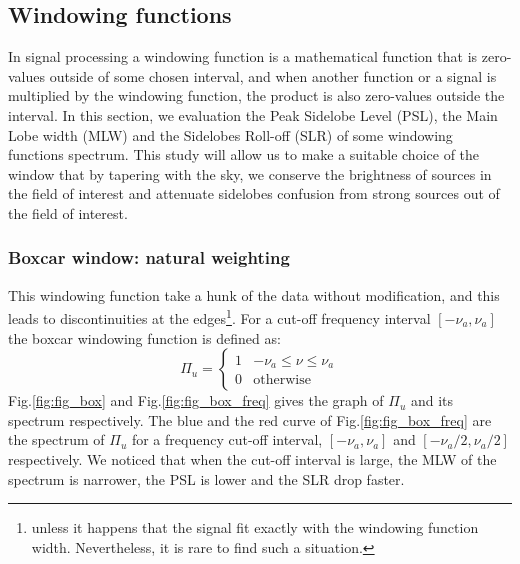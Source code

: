 \documentclass[useAMS,usenatbib]{mn2e}
\begin{document}
\subsection{Windowing functions}
\label{subsec:Windowing functions}
In signal processing a windowing function is a mathematical function that is zero-values outside of some chosen interval, and when another 
function or a signal is multiplied by the windowing function, the product is also zero-values outside the interval.
In this section, we evaluation the Peak Sidelobe Level (PSL), the Main 
Lobe width (MLW) and the Sidelobes Roll-off (SLR) of some windowing functions spectrum. This study will allow us to make 
a suitable choice of the window that by tapering with the sky, we conserve the brightness of sources in the field of 
interest and attenuate sidelobes confusion from strong sources out of the field of interest.
\subsubsection{Boxcar window: natural weighting}
This windowing function take a hunk of the data without modification, and  this leads to discontinuities at the edges\footnote{unless it 
happens that the signal  fit exactly with the windowing function width. Nevertheless, it is rare to find such a situation.}. For 
a cut-off frequency interval  $[-\nu_a,\nu_a]$ the boxcar windowing function is defined as:
\begin{equation}
\Pi_{u}=\left\{
\begin{array}{rl}
1 & \mbox{$-\nu_a \leq \nu \leq \nu_a$} \\
0 & \mbox{otherwise}
\end{array}\right.
\end{equation}
Fig.\ref{fig:fig_box} and Fig.\ref{fig:fig_box_freq} gives the graph of $\Pi_{u}$ and its spectrum respectively. The blue and 
the red curve of Fig.\ref{fig:fig_box_freq} are the spectrum of $\Pi_{u}$ for a frequency cut-off interval, $[-\nu_a,\nu_a]$ and 
$[-\nu_a/2,\nu_a/2]$ respectively. We noticed that when the cut-off interval is large, the MLW of the spectrum is 
narrower, the PSL is lower and the SLR drop faster. 
\end{document}
